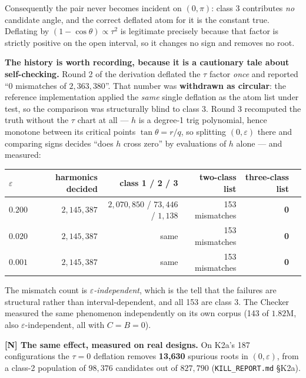 \documentclass[11pt,a4paper]{article}
\theoremstyle{definition}
\newcommand{\file}[1]{\texttt{\small #1}}
\begin{document}
\noindent Consequently the pair never becomes incident on $(0,\pi)$: class 3 contributes
\emph{no} candidate angle, and the correct deflated atom for it is the constant \textsf{true}.
Deflating by $(1-\cos\theta)\propto\tau^2$ is legitimate precisely because that factor is
strictly positive on the open interval, so it changes no sign and removes no root.

\textbf{The history is worth recording, because it is a cautionary tale about self-checking.}
Round 2 of the derivation deflated the $\tau$ factor \emph{once} and reported ``0 mismatches
of $2{,}363{,}380$''. That number was \textbf{withdrawn as circular}: the reference
implementation applied the \emph{same} single deflation as the atom list under test, so the
comparison was structurally blind to class 3. Round 3 recomputed the truth without the $\tau$
chart at all --- $h$ is a degree-1 trig polynomial, hence monotone between its critical
points $\tan\theta=r/q$, so splitting $(0,\varepsilon)$ there and comparing signs decides
``does $h$ cross zero'' by evaluations of $h$ alone --- and measured:

\begin{center}
\small
\begin{tabular}{@{}lrrrrr@{}}
\toprule
$\varepsilon$ & harmonics decided & class 1 / 2 / 3 & two-class list & \textbf{three-class list} \\
\midrule
$0.200$ & $2{,}145{,}387$ & $2{,}070{,}850$ / $73{,}446$ / $1{,}138$ & 153 mismatches & \textbf{0} \\
$0.020$ & $2{,}145{,}387$ & same & 153 mismatches & \textbf{0} \\
$0.001$ & $2{,}145{,}387$ & same & 153 mismatches & \textbf{0} \\
\bottomrule
\end{tabular}
\end{center}

\noindent The mismatch count is \emph{$\varepsilon$-independent}, which is the tell that the
failures are structural rather than interval-dependent, and all 153 are class 3. The Checker
measured the same phenomenon independently on its own corpus (143 of $1.82$M, also
$\varepsilon$-independent, all with $C=B=0$).

\textbf{[N] The same effect, measured on real designs.} On K2a's 187 configurations the
$\tau=0$ deflation removes \textbf{13{,}630} spurious roots in $(0,\varepsilon)$, from a
class-2 population of $98{,}376$ candidates out of $827{,}790$
(\file{KILL\_REPORT.md} §K2a).
\end{document}
